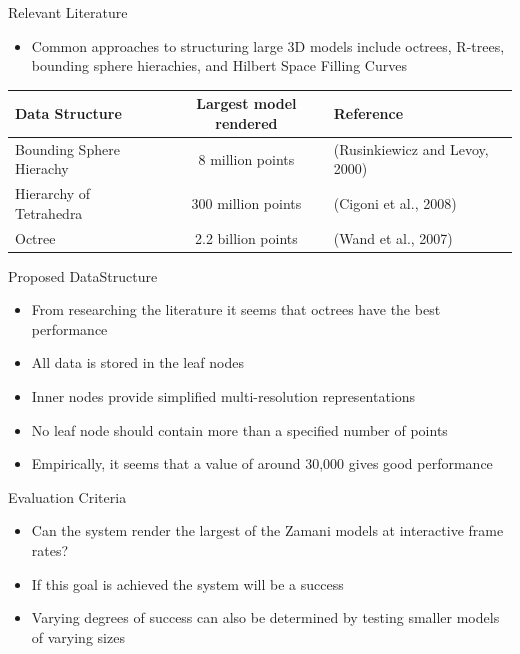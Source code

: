 \documentclass{beamer}
\begin{document}
{\begin{frame}{Relevant Literature}

\begin{itemize}
\item Common approaches to structuring large 3D models include octrees,
  R-trees, bounding sphere hierachies, and Hilbert Space Filling
  Curves
\end{itemize}
{\scriptsize
\begin{tabular}{l|c|l}
 Data Structure & Largest model rendered & Reference \\
\hline
\hline
Bounding Sphere Hierachy  & 8 million points & (Rusinkiewicz and Levoy, 2000) \\
\hline
Hierarchy of Tetrahedra   & 300 million points& (Cigoni et al., 2008)  \\
\hline
Octree          & 2.2 billion points& (Wand et al., 2007)    \\
\end{tabular}}

\end{frame}


\begin{frame}{Proposed DataStructure}

\begin{itemize}
\item From researching the literature it seems that octrees have the best
  performance
\item All data is stored in the leaf nodes
\item Inner nodes provide simplified multi-resolution representations
\item No leaf node should contain more than a specified number of points
\item Empirically, it seems that a value of around 30,000 gives good performance
\end{itemize}
\end{frame}


\begin{frame}{Evaluation Criteria}
\begin{itemize}
\item Can the system render the largest of the Zamani models at interactive
  frame rates?
\item If this goal is achieved the system will be a success
\item Varying degrees of success can also be determined by testing smaller
  models of varying sizes
\end{itemize}
\end{frame}
}
\end{document}
